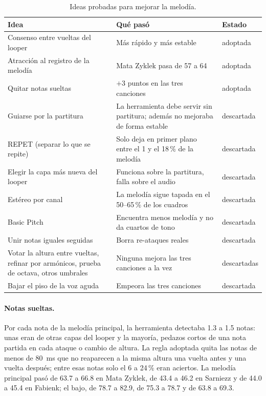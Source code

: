\begin{table}[ht]
  \centering\small
  \caption{Ideas probadas para mejorar la melodía.}\label{tab:hipotesis}
  \begin{tabularx}{\textwidth}{@{}>{\raggedright}p{4.6cm}>{\raggedright}X l@{}}
    \toprule
    Idea & Qué pasó & Estado \\
    \midrule
    Consenso entre vueltas del looper & Más rápido y más estable & adoptada \\
    Atracción al registro de la melodía & Mata Zyklek pasa de 57 a 64 & adoptada \\
    Quitar notas sueltas & $+3$ puntos en las tres canciones & adoptada \\
    Guiarse por la partitura & La herramienta debe servir sin partitura; además no mejoraba de forma estable & descartada \\
    REPET (separar lo que se repite) & Solo deja en primer plano entre el 1 y el 18\,\% de la melodía & descartada \\
    Elegir la capa más nueva del looper & Funciona sobre la partitura, falla sobre el audio & descartada \\
    Estéreo por canal & La melodía sigue tapada en el 50--65\,\% de los cuadros & descartada \\
    Basic Pitch & Encuentra menos melodía y no da cuartos de tono & descartada \\
    Unir notas iguales seguidas & Borra re-ataques reales & descartada \\
    Votar la altura entre vueltas, refinar por armónicos, prueba de octava, otros umbrales & Ninguna mejora las tres
    canciones a la vez & descartadas \\
    Bajar el piso de la voz aguda & Empeora las tres canciones & descartada \\
    \bottomrule
  \end{tabularx}
\end{table}

\paragraph{Notas sueltas.} Por cada nota de la melodía principal, la herramienta detectaba 1.3 a 1.5 notas: unas eran de
otras capas del looper y la mayoría, pedazos cortos de una nota partida en cada ataque o cambio de altura. La regla
adoptada quita las notas de menos de 80~ms que no reaparecen a la misma altura una vuelta antes y una vuelta después;
entre esas notas solo el 6 a 24\,\% eran aciertos. La melodía principal pasó de 63.7 a 66.8 en Mata Zyklek, de 43.4 a
46.2 en Sarniezz y de 44.0 a 45.4 en Fabienk; el bajo, de 78.7 a 82.9, de 75.3 a 78.7 y de 63.8 a 69.3.

